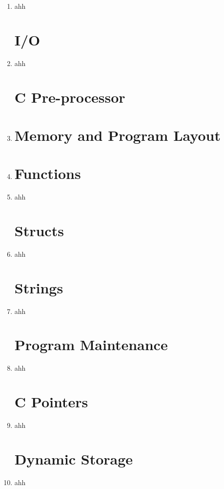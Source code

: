 \documentclass[11pt]{article}
\begin{document}
\begin{enumerate}
	\item ahh

\section*{I/O}

	\item ahh

\section*{C Pre-processor}

	\item 


\section*{Memory and Program Layout}

	\item 

\section*{Functions}

	\item ahh

\section*{Structs}

	\item ahh

\section*{Strings}

	\item ahh

\section*{Program Maintenance}

	\item ahh

\section*{C Pointers}

	\item ahh

\section*{Dynamic Storage}

	\item ahh


\end{enumerate}
\end{document}
